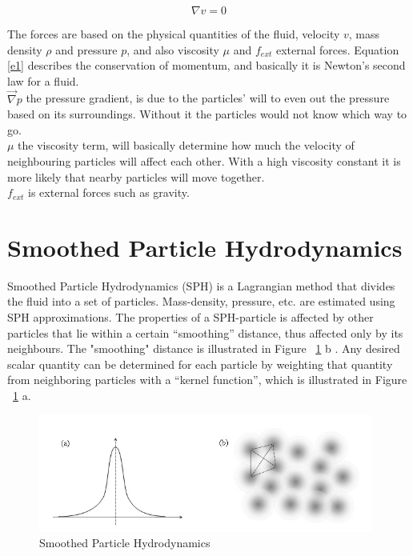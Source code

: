 \documentclass[a4paper,12pt,twoside,final]{report}
\begin{document}
\begin{equation}
{\nabla v} = {0}
\label{e0}
\end{equation}

\noindent The forces are based on the physical quantities of the fluid, velocity $v$, mass density $\rho$ and pressure $p$, and also viscosity $\mu$ and $f_{ext}$ external forces. Equation \ref{e1} describes the conservation of momentum, and basically it is Newton’s second law for a fluid.\\

\noindent  $\overrightarrow \nabla p$ the pressure gradient, is due to the particles’ will to even out the pressure based on its surroundings. Without it the particles would not know which way to go. \\

\noindent $\mu$ the viscosity term, will basically determine how much the velocity of neighbouring particles will affect each other. With a high viscosity constant it is more likely that nearby particles will move together. \\

\noindent $f_{ext}$ is external forces such as gravity.


\section{Smoothed Particle Hydrodynamics}
Smoothed Particle Hydrodynamics (SPH) \cite{kelager06} is a Lagrangian method that divides the fluid into a set of particles. Mass-density, pressure, etc. are estimated using SPH approximations. The properties of a SPH-particle is affected by other particles that lie within a certain “smoothing” distance, thus affected only by its neighbours. The "smoothing" distance is illustrated in Figure ~\ref{fig:sph} b \cite{sph}. Any desired scalar quantity can be determined for each particle by weighting that quantity from neighboring particles with a “kernel function”, which is illustrated in Figure ~\ref{fig:sph} a. \\

\begin{figure}[h]
\begin{center}
    \includegraphics[width=11cm]{figs/sph.jpg} 
\end{center}
\caption{Smoothed Particle Hydrodynamics}
\label{fig:sph}
\end{figure}
\end{document}
